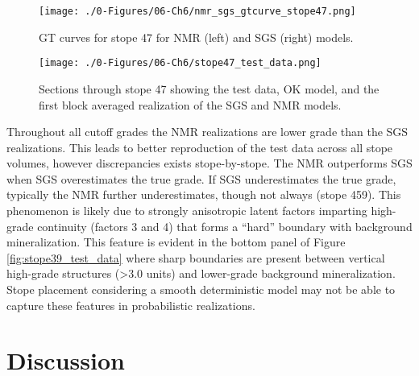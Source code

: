 \begin{figure}[htb!]
    \centering
    \texttt{[image: ./0-Figures/06-Ch6/nmr\_sgs\_gtcurve\_stope47.png]}
    \caption{\Gls{GT} curves for stope 47 for \gls{NMR} (left) and \gls{SGS} (right) models. }
    \label{fig:nmr_sgs_gtcurve_stope47}
\end{figure}

\begin{figure}[htb!]
    \centering
    \texttt{[image: ./0-Figures/06-Ch6/stope47\_test\_data.png]}
    \caption{Sections through stope 47 showing the test data, \gls{OK} model, and the first block averaged realization of the \gls{SGS} and \gls{NMR} models.}
    \label{fig:stope47_test_data}
\end{figure}

Throughout all cutoff grades the \gls{NMR} realizations are lower grade than the \gls{SGS} realizations. This leads to better reproduction of the test data across all stope volumes, however discrepancies exists stope-by-stope. The \gls{NMR} outperforms \gls{SGS} when \gls{SGS} overestimates the true grade. If \gls{SGS} underestimates the true grade, typically the \gls{NMR} further underestimates, though not always (stope 459). This phenomenon is likely due to strongly anisotropic latent factors imparting high-grade continuity (factors 3 and 4) that forms a ``hard'' boundary with background mineralization. This feature is evident in the bottom panel of Figure \ref{fig:stope39_test_data} where sharp boundaries are present between vertical high-grade structures (>3.0 units) and lower-grade background mineralization. Stope placement considering a smooth deterministic model may not be able to capture these features in probabilistic realizations.

\FloatBarrier
\section{Discussion}
\label{sec:discuss06}

